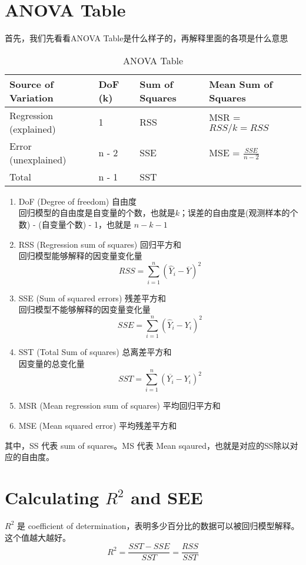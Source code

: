 \documentclass[cn,11pt,chinese]{elegantbook}
\begin{document}
\section{ANOVA Table}
    首先，我们先看看ANOVA Table是什么样子的，再解释里面的各项是什么意思
    \begin{table}[htbp]
        \centering
        \caption{ANOVA Table}
          \begin{tabular}{llll}
          \toprule
          Source of Variation & DoF (k) & Sum of Squares & Mean Sum of Squares \\
          \midrule
          Regression (explained) & 1 & RSS & MSR = \(RSS / k = RSS\)\\
          Error (unexplained) & n - 2 & SSE & MSE = \(\frac{SSE}{n - 2}\)\\
          \midrule
          Total & n - 1 & SST &   \\
          \bottomrule
          \end{tabular}%
        \label{tab:theorem-class}%
    \end{table}%

    \begin{enumerate}
        \item DoF (Degree of freedom) 自由度\\
                回归模型的自由度是自变量的个数，也就是\(k\)；误差的自由度是(观测样本的个数) - (自变量个数) - 1，也就是 \(n - k - 1\)
        \item RSS (Regression sum of squares) 回归平方和\\
                回归模型能够解释的因变量变化量 
                \[RSS = \sum_{i = 1}^n (\hat Y_i - \overline{Y})^2\]
        \item SSE (Sum of squared errors) 残差平方和\\
                回归模型不能够解释的因变量变化量 
                \[SSE = \sum_{i = 1}^n (\hat Y_i - Y_i)^2\]
        \item SST (Total Sum of squares) 总离差平方和\\
                因变量的总变化量
                \[SST = \sum_{i = 1}^n (\overline{Y_i} - Y_i)^2\]
        \item MSR (Mean regression sum of squares) 平均回归平方和
        \item MSE (Mean squared error) 平均残差平方和
    \end{enumerate}
    其中，SS 代表 sum of squares。MS 代表 Mean sqaured，也就是对应的SS除以对应的自由度。

\section{Calculating \(R^2\) and SEE}
    \(R^2\) 是 coefficient of determination，表明多少百分比的数据可以被回归模型解释。这个值越大越好。\[R^2 = \frac{SST - SSE}{SST} = \frac{RSS}{SST}\]
\end{document}
